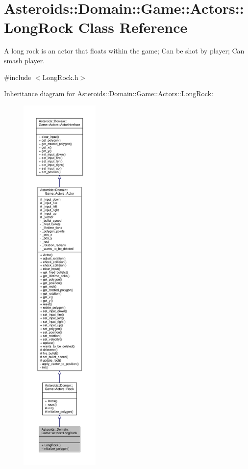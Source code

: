\hypertarget{classAsteroids_1_1Domain_1_1Game_1_1Actors_1_1LongRock}{}\section{Asteroids\+:\+:Domain\+:\+:Game\+:\+:Actors\+:\+:Long\+Rock Class Reference}
\label{classAsteroids_1_1Domain_1_1Game_1_1Actors_1_1LongRock}


A long rock is an actor that floats within the game; Can be shot by player; Can smash player.  




{\ttfamily \#include $<$Long\+Rock.\+h$>$}



Inheritance diagram for Asteroids\+:\+:Domain\+:\+:Game\+:\+:Actors\+:\+:Long\+Rock\+:\nopagebreak
\begin{figure}[H]
\begin{center}
\leavevmode
\includegraphics[height=550pt]{classAsteroids_1_1Domain_1_1Game_1_1Actors_1_1LongRock__inherit__graph}
\end{center}
\end{figure}


